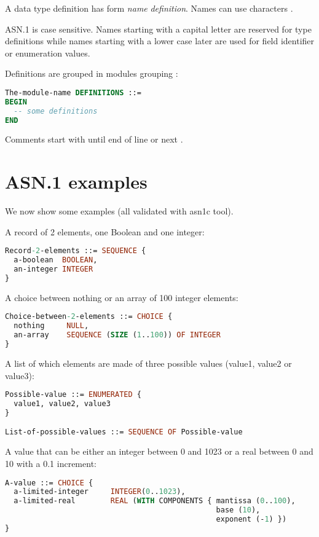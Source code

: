 A data type definition has form \emph{name} \ASN{::=}
\emph{definition}. Names can use characters .

ASN.1 is case sensitive. Names starting with a capital letter are
reserved for type definitions while names starting with a lower case
later are used for field identifier or enumeration values.

Definitions are grouped in modules grouping
:
\begin{lstlisting}[language=ASN1]
The-module-name DEFINITIONS ::=
BEGIN
  -- some definitions
END
\end{lstlisting}

Comments start with \ASN{--} until end of line or next \ASN{--}.

\section{ASN.1 examples}

We now show some examples (all validated with asn1c tool).

A record of 2 elements, one Boolean and one integer:
\begin{lstlisting}[language=ASN1]
Record-2-elements ::= SEQUENCE {
  a-boolean  BOOLEAN,
  an-integer INTEGER
}
\end{lstlisting}

A choice between nothing or an array of 100 integer elements:
\begin{lstlisting}[language=ASN1]
Choice-between-2-elements ::= CHOICE {
  nothing     NULL,
  an-array    SEQUENCE (SIZE (1..100)) OF INTEGER
}
\end{lstlisting}

A list of which elements are made of three possible values (value1,
value2 or value3):
\begin{lstlisting}[language=ASN1]
Possible-value ::= ENUMERATED {
  value1, value2, value3
}

List-of-possible-values ::= SEQUENCE OF Possible-value
\end{lstlisting}

A value that can be either an integer between 0 and 1023 or a real
between 0 and 10 with a 0.1 increment:
\begin{lstlisting}[language=ASN1]
A-value ::= CHOICE {
  a-limited-integer     INTEGER(0..1023),
  a-limited-real        REAL (WITH COMPONENTS { mantissa (0..100),
                                                base (10),
                                                exponent (-1) })
}
\end{lstlisting}


